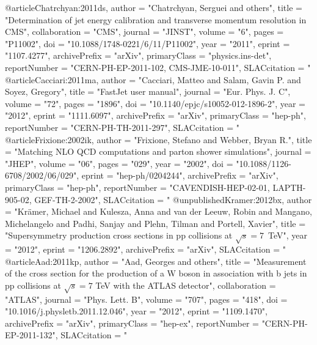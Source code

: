 @article{Chatrchyan:2011ds,
      author         = "Chatrchyan, Serguei and others",
      title          = "{Determination of jet energy calibration and transverse
                        momentum resolution in {CMS}}",
      collaboration  = "CMS",
      journal        = "JINST",
      volume         = "6",
      pages          = "P11002",
      doi            = "10.1088/1748-0221/6/11/P11002",
      year           = "2011",
      eprint         = "1107.4277",
      archivePrefix  = "arXiv",
      primaryClass   = "physics.ins-det",
      reportNumber   = "CERN-PH-EP-2011-102, CMS-JME-10-011",
      SLACcitation   = "%
}
@article{Cacciari:2011ma,
      author         = "Cacciari, Matteo and Salam, Gavin P. and Soyez, Gregory",
      title          = "{FastJet user manual}",
      journal        = "Eur. Phys. J. C",
      volume         = "72",
      pages          = "1896",
      doi            = "10.1140/epjc/s10052-012-1896-2",
      year           = "2012",
      eprint         = "1111.6097",
      archivePrefix  = "arXiv",
      primaryClass   = "hep-ph",
      reportNumber   = "CERN-PH-TH-2011-297",
      SLACcitation   = "%
}
@article{Frixione:2002ik,
      author         = "Frixione, Stefano and Webber, Bryan R.",
      title          = "{Matching {NLO} {QCD} computations and parton shower
                        simulations}",
      journal        = "JHEP",
      volume         = "06",
      pages          = "029",
      year           = "2002",
      doi            = "10.1088/1126-6708/2002/06/029",
      eprint         = "hep-ph/0204244",
      archivePrefix  = "arXiv",
      primaryClass   = "hep-ph",
      reportNumber   = "CAVENDISH-HEP-02-01, LAPTH-905-02, GEF-TH-2-2002",
      SLACcitation   = "%
}
@unpublished{Kramer:2012bx,
      author         = "Kr{\"{a}}mer, Michael and Kulesza, Anna and van der Leeuw,
                        Robin and Mangano, Michelangelo and Padhi, Sanjay and
                        Plehn, Tilman and Portell, Xavier",
      title          = "{Supersymmetry production cross sections in pp
                        collisions at $\sqrt{s}=7$~TeV}",
      year           = "2012",
      eprint         = "1206.2892",
      archivePrefix  = "arXiv",
      SLACcitation   = "%
}
@article{Aad:2011kp,
      author         = "Aad, Georges and others",
      title          = "{Measurement of the cross section for the production of a
                        W boson in association with  b jets in pp
                        collisions at $\sqrt{s}=7$ TeV with the ATLAS detector}",
      collaboration  = "ATLAS",
      journal        = "Phys. Lett. B",
      volume         = "707",
      pages          = "418",
      doi            = "10.1016/j.physletb.2011.12.046",
      year           = "2012",
      eprint         = "1109.1470",
      archivePrefix  = "arXiv",
      primaryClass   = "hep-ex",
      reportNumber   = "CERN-PH-EP-2011-132",
      SLACcitation   = "%
}
